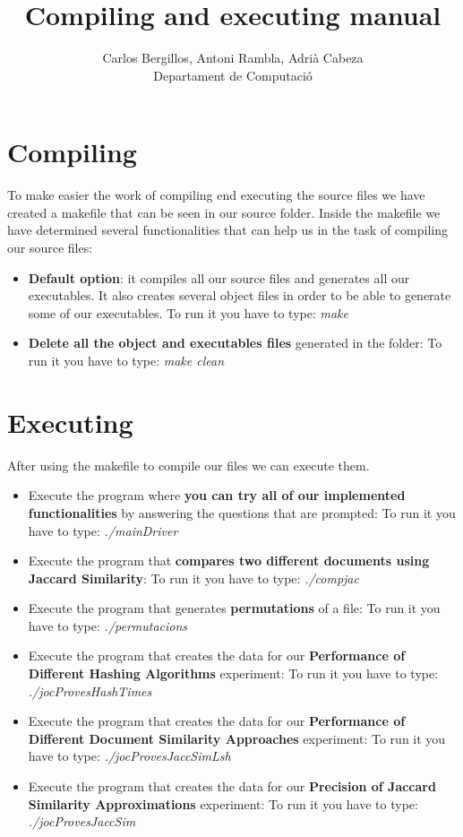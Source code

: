 \documentclass[12pt]{article}
\author{Carlos Bergillos, Antoni Rambla, Adrià Cabeza\\ Departament de Computació}
\title{Compiling and executing manual}
\begin{document}
  \maketitle  
   \newpage
   \section{Compiling}
   To make easier the work of compiling end executing the source files we have created a makefile that can be seen in our source folder. Inside the makefile we have determined several functionalities that can help us in the task of compiling our source files:
   
   \begin{itemize}
   \item \textbf{Default option}: it compiles all our source files and generates all our executables. It also creates several object files in order to be able to generate some of our executables. 
   To run it you have to type: \textit{make}
   \item \textbf{Delete all the object and executables files} generated in the folder:
   To run it you have to type: \textit{make clean}
   \end{itemize}
      \section{Executing}
         After using the makefile to compile our files we can execute them.
            
   \begin{itemize}
   
   \item Execute the program where \textbf{you can try all of our implemented functionalities} by answering the questions that are prompted:
   To run it you have to type: \textit{./mainDriver}
   
           \item Execute the program that \textbf{compares two different documents using Jaccard Similarity}:
   To run it you have to type: \textit{./compjac}
  

   \item Execute the program that generates \textbf{permutations} of a file:
   To run it you have to type: \textit{./permutacions}
    
\item Execute the program that creates the data for our \textbf{Performance of Different Hashing Algorithms} experiment:
   To run it you have to type: \textit{./jocProvesHashTimes}
  
\item Execute the program that creates the data for our \textbf{Performance of Different Document Similarity Approaches} experiment:
   To run it you have to type: \textit{./jocProvesJaccSimLsh}
   \item Execute the program that creates the data for our \textbf{Precision of Jaccard Similarity Approximations} experiment:
   To run it you have to type: \textit{./jocProvesJaccSim}
   
      \end{itemize}
\end{document}
